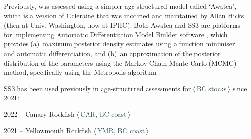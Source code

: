 \documentclass[11pt]{book}
\newcommand{\stock}[1]{$\langle$\,\textcolor{darkslategrey}{#1}\,$\rangle$}
\begin{document}
Previously, \spc{} was assessed using a simpler age-structured model called `Awatea', which is a version of Coleraine \citep{Hilborn-etal:2003} that was modified and maintained by Allan Hicks (then at Univ. Washington, now at \href{https://www.iphc.int/}{IPHC}).
Both Awatea and SS3 are platforms for implementing Automatic Differentiation Model Builder software \citep{ADMB:2009}, which provides (a)~maximum posterior density estimates using a function minimiser and automatic differentiation, and (b)~an approximation of the posterior distribution of the parameters using the Markov Chain Monte Carlo (MCMC) method, specifically using the Metropolis algorithm \citep{Gelman-etal:2004}.

SS3 has been used previously in age-structured assessments for \stock{BC stocks} since 2021:
\begin{itemize_csas}{}{}
  \item 2022 -- Canary Rockfish \stock{CAR, BC coast} \citep{Starr-Haigh:2023_car}
  \item 2021 -- Yellowmouth Rockfish \stock{YMR, BC coast} \citep{Starr-Haigh:2022_ymr}
\end{itemize_csas}
\end{document}
